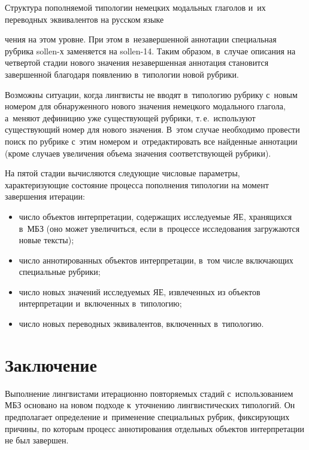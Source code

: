\begin{multicols}{2}
{\begin{center}
\end{center}


\noindent
{\small{Структура пополняемой типологии немецких модальных глаголов и~их переводных 
эквивалентов на русском языке}}
}



\noindent
 чения на этом уровне. При этом в~незавершенной аннотации 
специальная рубрика sollen-х заменяется на sollen-14. Таким образом, в~случае 
описания на четвертой стадии нового значения незавершенная аннотация 
становится завершенной благодаря появлению в~типологии новой рубрики.
  
  Возможны ситуации, когда лингвисты не вводят в~типологию рубрику 
с~новым номером для обнаруженного нового значения немецкого модального 
глагола, а~меняют дефиницию уже существующей рубрики, т.\,е.\ используют 
существующий номер для нового значения. В~этом случае необходимо 
про\-вес\-ти поиск по рубрике с~этим номером и~отредактировать все найденные 
аннотации (кроме случаев увеличения объема значения со\-от\-вет\-ст\-ву\-ющей
руб\-рики).
  
  На пятой стадии вычисляются сле\-ду\-ющие чис\-ло\-вые па\-ра\-мет\-ры, 
характеризующие со\-сто\-яние процесса пополнения типологии на момент 
завершения итерации:
  \begin{itemize}
  \item число объектов интерпретации, содержащих исследуемые ЯЕ, 
хранящихся в~МБЗ (оно может увеличиться, если в~процессе исследования 
загружаются новые текс\-ты);
  \item число аннотированных объектов интерпретации, в~том чис\-ле 
вклю\-ча\-ющих специальные рубрики;
  \item число новых значений ис\-сле\-ду\-емых ЯЕ, извлеченных из объектов 
интерпретации и~вклю\-чен\-ных в~типологию;
  \item число новых переводных эквивалентов, вклю\-чен\-ных в~типологию.
  \end{itemize}
  
\section{Заключение}
    
  Выполнение лингвистами итерационно повторяемых стадий 
с~использованием МБЗ основано на новом подходе к~уточнению 
лингвистических типологий. Он предполагает определение и~применение 
специальных руб\-рик, фиксирующих причины, по которым процесс 
аннотирования отдельных объектов интерпретации не был завершен. 
  

\end{multicols}
